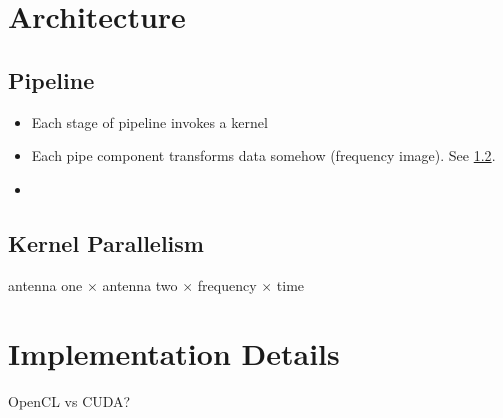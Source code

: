 \documentclass[]{article}
\begin{document}
\section{Architecture}

\subsection{Pipeline}

\begin{itemize}
\item Each stage of pipeline invokes a kernel
\item Each pipe component transforms data somehow (frequency image). See \ref{sec:kernel_parallelism}.
\item 
\end{itemize}

\subsection{Kernel Parallelism}
\label{sec:kernel_parallelism}

antenna one $\times$ antenna two $\times$ frequency $\times$ time

\section{Implementation Details}

OpenCL vs CUDA?



\end{document}
